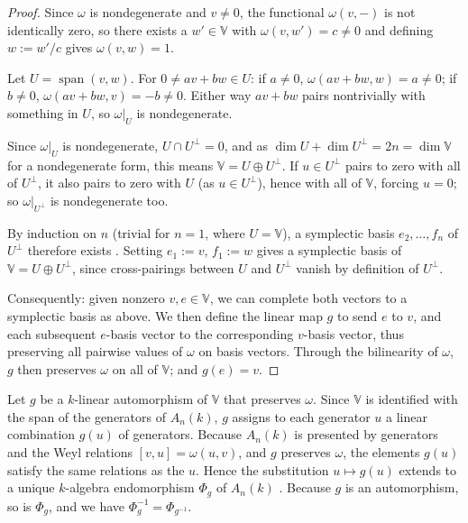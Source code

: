 \documentclass[pdflatex,sn-mathphys-num]{sn-jnl}
\numberwithin{equation}{section}
\theoremstyle{thmstyleone}
\theoremstyle{thmstyletwo}
\begin{document}
\begin{proof}
Since $\omega$ is nondegenerate and $v\neq0$, the functional $\omega(v,-)$
is not identically zero, so there exists a $w'\in\mathbb V$ with
$\omega(v,w')=c\neq0$ and defining $w:=w'/c$ gives $\omega(v,w)=1$.

Let $U=\operatorname{span}(v,w)$. For $0\neq av+bw\in U$: if $a\neq0$,
$\omega(av+bw,w)=a\neq0$; if $b\neq0$, $\omega(av+bw,v)=-b\neq0$. Either
way $av+bw$ pairs nontrivially with something in $U$, so $\omega|_U$ is
nondegenerate.

Since $\omega|_U$ is nondegenerate, $U\cap U^\perp=0$, and as
$\dim U+\dim U^\perp=2n = \dim\mathbb V$ \cite[Prop. 11.2.1]{coutinho} for a nondegenerate form, this means
$\mathbb V=U\oplus U^\perp$. If $u\in U^\perp$ pairs to zero with all of
$U^\perp$, it also pairs to zero with $U$ (as $u\in U^\perp$), hence with
all of $\mathbb V$, forcing $u=0$; so $\omega|_{U^\perp}$ is nondegenerate
too.

By induction on $n$ (trivial for $n=1$, where $U=\mathbb V$), a
symplectic basis $e_2,\ldots,f_n$ of $U^\perp$ therefore exists \cite[XV.8.1 and XV.8.2]{lang}. Setting $e_1:=v$,
$f_1:=w$ gives a symplectic basis of $\mathbb V=U\oplus U^\perp$, since
cross-pairings between $U$ and $U^\perp$ vanish by definition of
$U^\perp$.

Consequently: given nonzero $v,e\in\mathbb V$, we can complete both vectors to a symplectic basis as above. We then define the linear map $g$ to send $e$ to $v$, and each subsequent $e$-basis vector to the corresponding $v$-basis vector, thus preserving all pairwise values of $\omega$ on basis vectors. Through the bilinearity of $\omega$, $g$ then preserves $\omega$ on all of $\mathbb V$; and $g(e)=v$.
\end{proof}
Let $g$ be a $k$-linear automorphism of $\mathbb V$ that preserves $\omega$.
Since $\mathbb V$ is identified with the span of the generators of $A_n(k)$,
$g$ assigns to each generator $u$ a linear combination $g(u)$ of generators.
Because $A_n(k)$ is presented by generators and the Weyl relations
$[v,u]=\omega(u,v)$, and $g$ preserves $\omega$, the elements $g(u)$ satisfy
the same relations as the $u$. Hence the substitution $u\mapsto g(u)$ extends
to a unique $k$-algebra endomorphism $\Phi_{g}$ of $A_n(k)$ \cite[Th. 1.3.1, Ex. 7.6.9]{coutinho}. Because $g$ is an automorphism, so is $\Phi_g$, and we have $\Phi_g^{-1} = \Phi_{g^{-1}}.$
\end{document}
